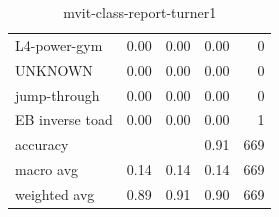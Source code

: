 \begin{table}[h!]
\begin{tabular}{|l|r|r|r|r|}
         L4-power-gym &      0.00 &     0.00 &     0.00 &        0 \\
              UNKNOWN &      0.00 &     0.00 &     0.00 &        0 \\
         jump-through &      0.00 &     0.00 &     0.00 &        0 \\
      EB inverse toad &      0.00 &     0.00 &     0.00 &        1 \\ \hline
             accuracy &           &          &     0.91 &      669 \\
            macro avg &      0.14 &     0.14 &     0.14 &      669 \\
         weighted avg &      0.89 &     0.91 &     0.90 &      669 \\
         \hline
    \end{tabular}
    \caption{mvit-class-report-turner1}
    \label{tbl:mvit-class-report-turner1}
\end{table}

